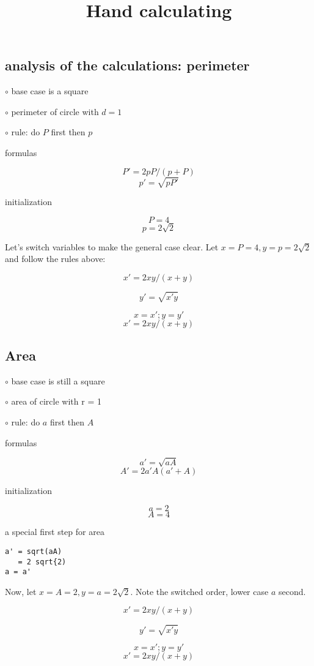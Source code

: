\documentclass[11pt, oneside]{article}
\title{Hand calculating}
\date{}
\begin{document}
\maketitle
\Large

\subsection*{analysis of the calculations:  perimeter}

$\circ$  base case is a square

$\circ$  perimeter of circle with $d = 1$

$\circ$  rule: do $P$ first then $p$

formulas

\[ P' = 2pP/(p + P) \]
\[ p' = \sqrt{pP'} \]

initialization

\[ P = 4 \]
\[ p = 2 \sqrt{2} \]

Let's switch variables to make the general case clear.  Let $x = P = 4, y = p = 2 \sqrt{2}$ and follow the rules above:

\[ x' = 2xy/(x+y) \]

\[ y' = \sqrt{x'y} \]

\[ x = x'; y = y' \]
\[ x' = 2xy/(x+y) \]

\subsection*{Area}

$\circ$  base case is still a square

$\circ$  area of circle with r = 1

$\circ$  rule:  do $a$ first then $A$

formulas

\[ a' = \sqrt{aA} \]
\[ A' = 2a'A(a'+A) \]

initialization

\[ a = 2 \] 
\[ A = 4 \]

a special first step for area

\begin{verbatim}
a' = sqrt(aA)
   = 2 sqrt{2)
a = a'
\end{verbatim}

Now, let $x = A = 2, y = a = 2 \sqrt{2}$.  Note the switched order, lower case $a$ second.

\[ x' = 2xy/(x+y) \]

\[ y' = \sqrt{x'y} \]

\[ x = x'; y = y' \]
\[ x' = 2xy/(x+y) \]
\end{document}
